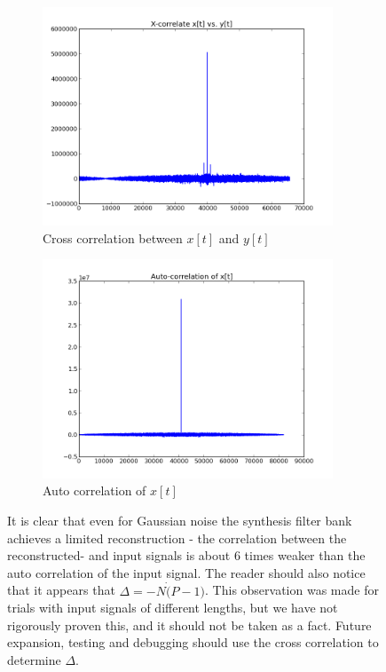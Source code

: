 \documentclass[a4paper,10pt]{article}
\begin{document}
\begin{figure}
 \begin{subfigure}{0.5\textwidth}
  \includegraphics[width=0.95\textwidth]{x_cor.png}
  \caption{Cross correlation between $x[t]$ and $y[t]$}
 \end{subfigure}
 \begin{subfigure}{0.5\textwidth}
  \includegraphics[width=0.95\textwidth]{auto_cor.png}
  \caption{Auto correlation of $x[t]$}
 \end{subfigure}
\caption[Correlation between synthesis filter bank and input]{It is clear that even for Gaussian noise the synthesis filter bank achieves a limited reconstruction - the correlation between the reconstructed- and 
input signals is about 6 times weaker than the auto correlation of the input signal. The reader should also notice that it appears that $\Delta = -N\dot (P-1)$. This observation was made for 
trials with input signals of different lengths, but we have not rigorously proven this, and it should not be taken as a fact. Future expansion, testing and debugging should use
the cross correlation to determine $\Delta$.}
\label{correlation}
\end{figure}
\end{document}
